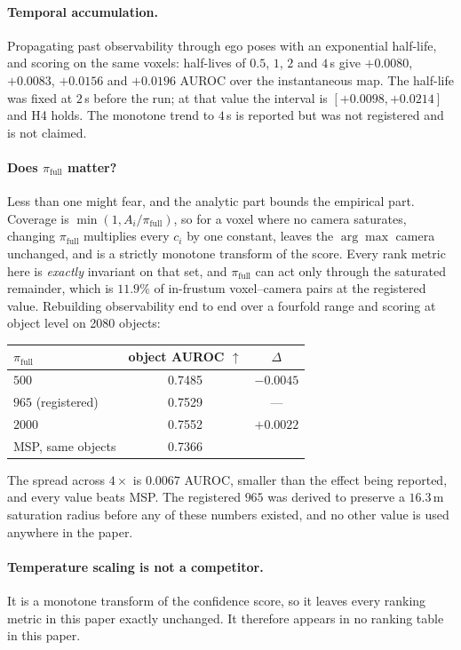 \documentclass[10pt,twocolumn,letterpaper]{article}
\begin{document}
\paragraph{Temporal accumulation.} Propagating past observability through
ego poses with an exponential half-life, and scoring on the same voxels:
half-lives of $0.5$, $1$, $2$ and $4$\,s give $+0.0080$, $+0.0083$,
$+0.0156$ and $+0.0196$ AUROC over the instantaneous map. The half-life was
fixed at $2$\,s before the run; at that value the interval is
$[+0.0098, +0.0214]$ and H4 holds. The monotone trend to $4$\,s is reported
but was not registered and is not claimed.

\paragraph{Does $\pi_{\text{full}}$ matter?} Less than one might fear,
and the analytic part bounds the empirical part. Coverage is
$\min(1, A_i/\pi_{\text{full}})$, so for a voxel where no camera saturates,
changing $\pi_{\text{full}}$ multiplies every $c_i$ by one constant, leaves
the $\arg\max$ camera unchanged, and is a strictly monotone transform of the
score. Every rank metric here is \emph{exactly} invariant on that set, and
$\pi_{\text{full}}$ can act only through the saturated remainder, which is
$11.9\%$ of in-frustum voxel--camera pairs at the registered value.
Rebuilding observability end to end over a fourfold range and scoring at
object level on 2080 objects:
\begin{center}\small
\begin{tabular}{lcc}
\toprule
$\pi_{\text{full}}$ & object AUROC $\uparrow$ & $\Delta$ \\
\midrule
$500$   & 0.7485 & $-0.0045$ \\
$965$ \;(registered) & 0.7529 & --- \\
$2000$  & 0.7552 & $+0.0022$ \\
\midrule
MSP, same objects & 0.7366 & \\
\bottomrule
\end{tabular}
\end{center}
The spread across $4\times$ is $0.0067$ AUROC, smaller than the effect being
reported, and every value beats MSP. The registered $965$ was derived to
preserve a $16.3$\,m saturation radius before any of these numbers existed,
and no other value is used anywhere in the paper.

\paragraph{Temperature scaling is not a competitor.} It is a monotone
transform of the confidence score, so it leaves every ranking metric in this
paper exactly unchanged. It therefore appears in no ranking table in this paper.
\end{document}
